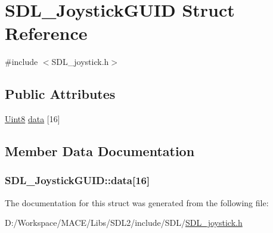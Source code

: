 \hypertarget{struct_s_d_l___joystick_g_u_i_d}{}\section{S\+D\+L\+\_\+\+Joystick\+G\+U\+ID Struct Reference}
\label{struct_s_d_l___joystick_g_u_i_d}


{\ttfamily \#include $<$S\+D\+L\+\_\+joystick.\+h$>$}

\subsection*{Public Attributes}
\begin{DoxyCompactItemize}
\item 
\hyperlink{_s_d_l__stdinc_8h_a2944638813a090aa23e62f4da842c3e2}{Uint8} \hyperlink{struct_s_d_l___joystick_g_u_i_d_a16935b928a608fe98e0509f242590597}{data} \mbox{[}16\mbox{]}
\end{DoxyCompactItemize}


\subsection{Member Data Documentation}
\subsubsection[{\texorpdfstring{data}{data}}]{ S\+D\+L\+\_\+\+Joystick\+G\+U\+I\+D\+::data\mbox{[}16\mbox{]}}\hypertarget{struct_s_d_l___joystick_g_u_i_d_a16935b928a608fe98e0509f242590597}{}\label{struct_s_d_l___joystick_g_u_i_d_a16935b928a608fe98e0509f242590597}


The documentation for this struct was generated from the following file\+:\begin{DoxyCompactItemize}
\item 
D\+:/\+Workspace/\+M\+A\+C\+E/\+Libs/\+S\+D\+L2/include/\+S\+D\+L/\hyperlink{_s_d_l__joystick_8h}{S\+D\+L\+\_\+joystick.\+h}\end{DoxyCompactItemize}
